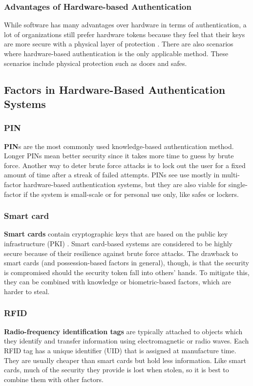 \subsubsection{Advantages of Hardware-based Authentication}
While software has many advantages over hardware in terms of authentication, a lot of organizations still prefer hardware tokens because they feel that their keys are more secure with a physical layer of protection \cite{AAMHS2011}. There are also scenarios where hardware-based authentication is the only applicable method. These scenarios include physical protection such as doors and safes.

\subsection{Factors in Hardware-Based Authentication Systems}
\subsubsection{PIN}
\textbf{PIN}s are the most commonly used knowledge-based authentication method. Longer PINs mean better security since it takes more time to guess by brute force. Another way to deter brute force attacks is to lock out the user for a fixed amount of time after a streak of failed attempts. PINs see use mostly in multi-factor hardware-based authentication systems, but they are also viable for single-factor if the system is small-scale or for personal use only, like safes or lockers.

\subsubsection{Smart card}
\textbf{Smart cards} contain cryptographic keys that are based on the public key infrastructure (PKI) \cite{AAMHS2011}. Smart card-based systems are considered to be highly secure because of their resilience against brute force attacks. The drawback to smart cards (and possession-based factors in general), though, is that the security is compromised should the security token fall into others' hands. To mitigate this, they can be combined with knowledge or biometric-based factors, which are harder to steal.

\subsubsection{RFID}
\textbf{Radio-frequency identification tags} are typically attached to objects which they identify and transfer information using electromagnetic or radio waves. Each RFID tag has a unique identifier (UID) that is assigned at manufacture time. They are usually cheaper than smart cards but hold less information. Like smart cards, much of the security they provide is lost when stolen, so it is best to combine them with other factors.

